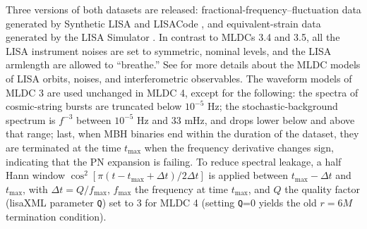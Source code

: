 \documentclass{iopart}
\begin{document}
Three versions of both datasets are released: fractional-frequency--fluctuation data generated by Synthetic LISA \cite{synthlisa} and LISACode \cite{lisacode}, and equivalent-strain data generated by the LISA Simulator \cite{lisasimulator}. In contrast to MLDCs 3.4 and 3.5, all the LISA instrument noises are set to symmetric, nominal levels, and the LISA armlength are allowed to ``breathe.'' See \cite{mldcgwdaw2,MLDC3} for more details about the MLDC models of LISA orbits, noises, and interferometric observables. The waveform models of MLDC 3 \cite{MLDC3} are used unchanged in MLDC 4, except for the following: the spectra of cosmic-string bursts are truncated below $10^{-5}$ Hz; the stochastic-background spectrum is $f^{-3}$ between $10^{-5}$ Hz and 33 mHz, and drops lower below and above that range; last, 
when MBH binaries end within the duration of the dataset, they are terminated 
at the time $t_\mathrm{max}$ when the frequency derivative changes sign, indicating that the PN expansion is failing. To reduce spectral leakage, a half Hann window $\cos^2[\pi (t - t_\mathrm{max} + \Delta t) / 2 \Delta t]$ is applied between $t_\mathrm{max} - \Delta t$ and $t_\mathrm{max}$, with $\Delta t = Q/f_\mathrm{max}$, $f_\mathrm{max}$ the frequency at time $t_\mathrm{max}$, and $Q$ the quality factor (lisaXML parameter \texttt{Q}) set to 3 for MLDC 4 (setting \texttt{Q}=0 yields the old $r = 6M$ termination condition).
%
\end{document}
